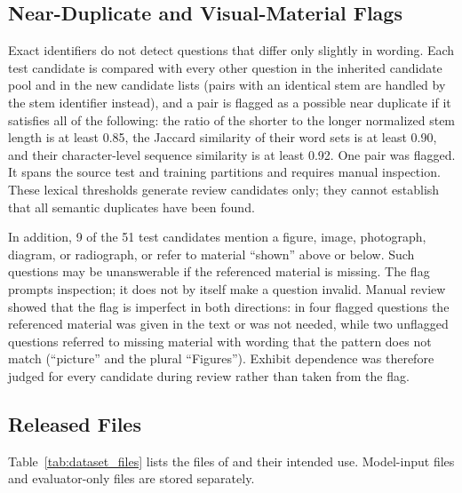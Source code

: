 \subsection{Near-Duplicate and Visual-Material Flags}

Exact identifiers do not detect questions that differ only slightly in wording. Each test candidate is compared with every other question in the inherited candidate pool and in the new candidate lists (pairs with an identical stem are handled by the stem identifier instead), and a pair is flagged as a possible near duplicate if it satisfies all of the following: the ratio of the shorter to the longer normalized stem length is at least 0.85, the Jaccard similarity of their word sets is at least 0.90, and their character-level sequence similarity is at least 0.92. One pair was flagged. It spans the source test and training partitions and requires manual inspection. These lexical thresholds generate review candidates only; they cannot establish that all semantic duplicates have been found.

In addition, 9 of the 51 test candidates mention a figure, image, photograph, diagram, or radiograph, or refer to material ``shown'' above or below. Such questions may be unanswerable if the referenced material is missing. The flag prompts inspection; it does not by itself make a question invalid. Manual review showed that the flag is imperfect in both directions: in four flagged questions the referenced material was given in the text or was not needed, while two unflagged questions referred to missing material with wording that the pattern does not match (``picture'' and the plural ``Figures''). Exhibit dependence was therefore judged for every candidate during review rather than taken from the flag.

\subsection{Released Files}

Table~\ref{tab:dataset_files} lists the files of \dataversion{} and their intended use. Model-input files and evaluator-only files are stored separately.

